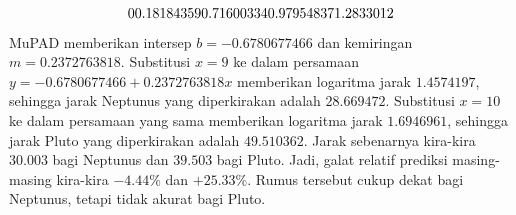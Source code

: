\begin{exercises}
\begin{answer}
\begin{exparts}
\begin{equation*}
{                           0 \\
                           0.18184359 \\
                           0.71600334 \\
                           0.97954837 \\
                           1.2833012}
            \end{equation*}
            MuPAD memberikan intersep $b= -0.6780677466$ dan kemiringan
            $m=0.2372763818$.
            Substitusi $x=9$ ke dalam persamaan
            $y= -0.6780677466+0.2372763818x$ memberikan logaritma jarak
            $1.4574197$, sehingga jarak Neptunus yang diperkirakan adalah
            $28.669472$.
          \partsitem Substitusi $x=10$ ke dalam persamaan yang sama memberikan
            logaritma jarak $1.6946961$, sehingga jarak Pluto yang diperkirakan
            adalah $49.510362$.
          \partsitem Jarak sebenarnya kira-kira $30.003$ bagi Neptunus dan
            $39.503$ bagi Pluto. Jadi, galat relatif prediksi masing-masing
            kira-kira $-4.44\%$ dan $+25.33\%$. Rumus tersebut cukup dekat bagi
            Neptunus, tetapi tidak akurat bagi Pluto.
        \end{exparts}
      \end{answer}

\end{exercises}
